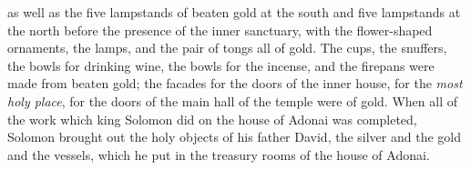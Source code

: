 \begin{biblechapter}
\verse as well as the five lampstands of beaten gold at the south and five lampstands at the north before the presence of the inner sanctuary, with the flower-shaped ornaments, the lamps, and the pair of tongs all of gold.
\verse The cups, the snuffers, the bowls for drinking wine, the bowls for the incense, and the firepans were made from beaten gold; the facades for the doors of the inner house, for the \textit{most holy place}, for the doors of the main hall of the temple were of gold.
\verse When all of the work which king Solomon did on the house of Adonai was completed, Solomon brought out the holy objects of his father David, the silver and the gold and the vessels, which he put in the treasury rooms of the house of Adonai.
\end{biblechapter}

